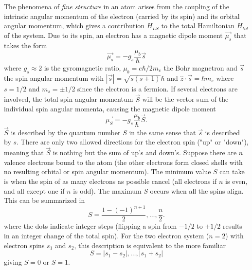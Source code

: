 \documentclass[a4paper]{article}
\begin{document}
The phenomena of \textit{fine structure} in an atom arises from the coupling of the intrinsic angular momentum of the electron (carried by its spin) and its orbital angular momentum, which gives a contribution $H_{LS}$ to the total Hamiltonian $H_{tot}$ of the system. Due to its spin, an electron has a magnetic dipole moment $\vec{\mu_s}$ that takes the form
\begin{equation}
\vec{\mu_s} = -g_s \frac{\mu_b}{\hbar} \vec{s}
\end{equation}
where $g_s \approx 2$ is the gyromagnetic ratio, $\mu_b = e \hbar / 2m_e$ the Bohr magnetron and $\vec{s}$ the spin angular momentum with $|\vec{s}|=\sqrt{s(s+1)} \hbar$ and $\hat{z} \cdot \vec{s} = \hbar m_s$ where $s=1/2$ and $m_s = \pm 1/2$ since the electron is a fermion. If several electrons are involved, the total spin angular momentum $\vec{S}$ will be the vector sum of the individual spin angular momenta, causing the magnetic dipole moment
\begin{equation}
\vec{\mu_S} = -g_s \frac{\mu_b}{\hbar} \vec{S}. 	\label{muS}
\end{equation}
$\vec{S}$ is described by the quantum number $S$ in the same sense that $\vec{s}$ is described by $s$. There are only two allowed directions for the electron spin ("up" or "down"), meaning that $\vec{S}$ is nothing but the sum of up's and down's. Suppose there are $n$ valence electrons bound to the atom (the other electrons form closed shells with no resulting orbital or spin angular momentum). The minimum value $S$ can take is when the spin of as many electrons as possible cancel (all electrons if $n$ is even, and all except one if $n$ is odd). The maximum $S$ occurs when all the spins align. This can be summarized in
\begin{equation}
S = \frac{1-(-1)^{n+1}}{2} , \dots , \frac{n}{2}.
\end{equation}
where the dots indicate integer steps (flipping a spin from $-1/2$ to $+1/2$ results in an integer change of the total spin). For the two electron system ($n=2$) with electron spins $s_1$ and $s_2$, this description is equivalent to the more familiar
\begin{equation}
S = |s_1 - s_2|, \dots, |s_1 + s_2|
\end{equation}
giving $S=0$ or $S=1$. 
\end{document}
